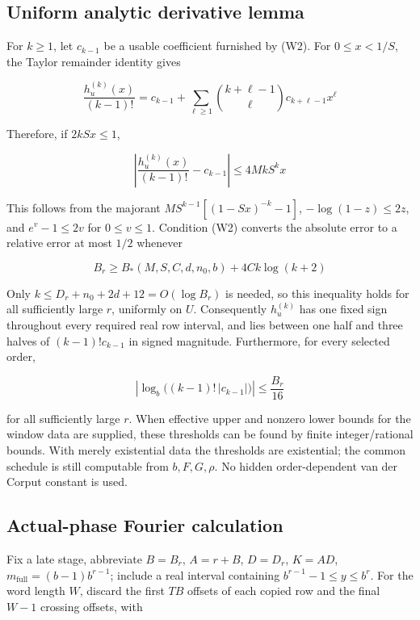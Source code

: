 \documentclass[11pt,a4paper]{article}
\begin{document}
\subsection{Uniform analytic derivative
lemma}\label{uniform-analytic-derivative-lemma}

For \(k\ge 1\), let \(c_{k-1}\) be a usable coefficient furnished by
(W2). For \(0\le x< 1/S\), the Taylor remainder identity gives

\[
\frac{h_u^{(k)}(x)}{(k-1)!}=c_{k-1}+\sum_{\ell\ge1}\binom{k+\ell-1}{\ell}c_{k+\ell-1}x^\ell
\]

Therefore, if \(2k S x\le 1\),

\[
\left|\frac{h_u^{(k)}(x)}{(k-1)!}-c_{k-1}\right|\le4MkS^kx \tag{2.1}
\]

This follows from the majorant \(M S^{k-1}[(1-Sx)^{-k}-1]\),
\(-\log(1-z)\le 2z\), and \(e^v-1\le 2v\) for \(0\le v\le 1\). Condition
(W2) converts the absolute error to a relative error at most \(1/2\)
whenever

\[
B_r\ge B_*(M,S,C,d,n_0,b)+4Ck\log(k+2)
\]

Only \(k\le D_r+n_0+2d+12=O(\log B_r)\) is needed, so this inequality
holds for all sufficiently large \(r\), uniformly on \(U\). Consequently
\(h_u^{(k)}\) has one fixed sign throughout every required real row
interval, and lies between one half and three halves of
\((k-1)! c_{k-1}\) in signed magnitude. Furthermore, for every selected
order,

\[
\left|\log_b\bigl((k-1)!\,|c_{k-1}|\bigr)\right|\le\frac{B_r}{16} \tag{2.2}
\]

for all sufficiently large \(r\). When effective upper and nonzero lower
bounds for the window data are supplied, these thresholds can be found
by finite integer/rational bounds. With merely existential data the
thresholds are existential; the common schedule is still computable from
\(b,F,G,\rho\). No hidden order-dependent van der Corput constant is
used.

\subsection{Actual-phase Fourier
calculation}\label{actual-phase-fourier-calculation}

Fix a late stage, abbreviate \(B=B_r\), \(A=r+B\), \(D=D_r\), \(K=AD\),
\(m_{\mathrm{full}}=(b-1)b^{r-1}\); include a real interval containing
\(b^{r-1}-1 \le  y \le  b^r\). For the word length \(W\), discard the
first \(T B\) offsets of each copied row and the final \(W-1\) crossing
offsets, with
\end{document}
